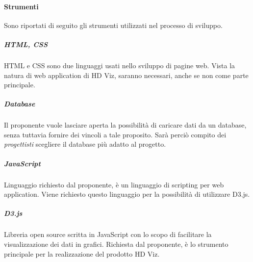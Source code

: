 \documentclass[../norme_di_progetto.tex]{subfiles}
\begin{document}
    \paragraph{Strumenti}
    Sono riportati di seguito gli strumenti utilizzati nel processo di sviluppo.

        \subparagraph{HTML, CSS}
        HTML e CSS sono due linguaggi usati nello sviluppo di pagine web. Vista la natura di web application di HD Viz, saranno necessari, anche se non come parte principale.

        \subparagraph{Database}
        Il proponente vuole lasciare aperta la possibilità di caricare dati da un database, senza tuttavia fornire dei vincoli a tale proposito. Sarà perciò compito dei \emph{progettisti} scegliere il database più adatto al progetto.

        \subparagraph{JavaScript}
        Linguaggio richiesto dal proponente, è un linguaggio di scripting per web application. Viene richiesto questo linguaggio per la possibilità di utilizzare D3.js.

        \subparagraph{D3.js}
        Libreria open source scritta in JavaScript con lo scopo di facilitare la visualizzazione dei dati in grafici. Richiesta dal proponente, è lo strumento principale per la realizzazione del prodotto HD Viz.
\end{document}
